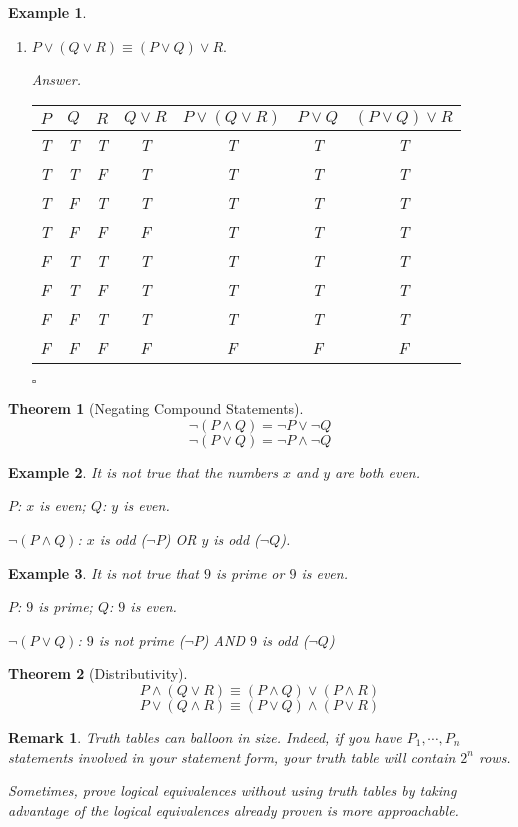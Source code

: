 \documentclass[12pt,a4paper]{article}
\newtheorem{thm}{Theorem}[subsection]
\newtheorem{eg}{Example}[subsection]
\newenvironment*{ans}{\par{\textit{Answer. }}}{\hfill{$\square$}\par}
\newtheorem*{rmk}{\indent Remark}
\begin{document}
\begin{eg}
\begin{enumerate}
		\item $P\vee(Q\vee R)\equiv(P\vee Q)\vee R.$
		\begin{ans}\begin{center}\begin{tabular}{c|c|c|c|c|c|c}
			$P$&$Q$&$R$&$Q\vee R$&$P\vee(Q\vee R)$&$P\vee Q$&$(P\vee Q)\vee R$\\
			\hline
			T&T&T&T&T&T&T\\
			T&T&F&T&T&T&T\\
			T&F&T&T&T&T&T\\
			T&F&F&F&T&T&T\\
			F&T&T&T&T&T&T\\
			F&T&F&T&T&T&T\\
			F&F&T&T&T&T&T\\
			F&F&F&F&F&F&F
		\end{tabular}\end{center}\end{ans}
	\end{enumerate}	
\end{eg}
\begin{thm}[Negating Compound Statements]
	\[\neg(P\wedge Q)=\neg P\vee\neg Q\]	
	\[\neg(P\vee Q)=\neg P\wedge\neg Q\]
\end{thm}
\begin{eg}
	It is not true that the numbers $x$ and $y$ are both even. 
	
	$P$: $x$ is even; $Q$: $y$ is even.
	
	$\neg(P\wedge Q)$: $x$ is odd ($\neg P$) OR $y$ is odd ($\neg Q$).	
\end{eg}
\begin{eg}
	It is not true that $9$ is prime or $9$ is even. 
	
	$P$: $9$ is prime; $Q$: $9$ is even.
	
	$\neg(P\vee Q)$: $9$ is not prime ($\neg P$) AND $9$ is odd ($\neg Q$)	
\end{eg}
\begin{thm}[Distributivity]
	\[P\wedge (Q\vee R)\equiv(P\wedge Q)\vee(P\wedge R)\]
	\[P\vee (Q\wedge R)\equiv(P\vee Q)\wedge(P\vee R)\]
\end{thm}
\begin{rmk}
	Truth tables can balloon in size. Indeed, if you have $P_1,\cdots,P_n$ statements involved in your statement form, your truth table will contain $2^n$ rows. 
	
	Sometimes, prove logical equivalences without using truth tables by taking advantage of the logical equivalences already proven is more approachable. 
\end{rmk}
\end{document}
